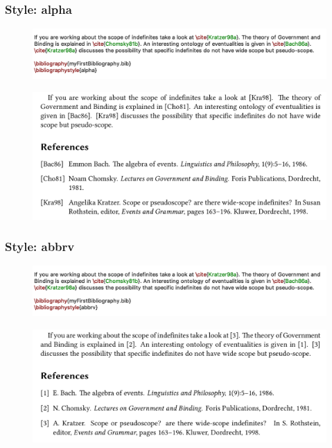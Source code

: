 \begin{frame}[fragile]
\frametitle{Style: alpha}

\begin{figure}
\centering
\includegraphics[width=.75\textwidth]{../../texfiles-beamer/tex-material/WissArb-latex/xelatex-bib-alpha}
\end{figure}

\begin{figure}
\centering
\includegraphics[width=.75\textwidth]{../../texfiles-beamer/tex-material/WissArb-latex/xelatex-bib-alpha-pdf}
\end{figure}

\end{frame}


\begin{frame}[fragile]
\frametitle{Style: abbrv}

\begin{figure}
\centering
\includegraphics[width=.75\textwidth]{../../texfiles-beamer/tex-material/WissArb-latex/xelatex-bib-abbrv}
\end{figure}

\begin{figure}
\centering
\includegraphics[width=.75\textwidth]{../../texfiles-beamer/tex-material/WissArb-latex/xelatex-bib-abbrv-pdf}
\end{figure}

\end{frame}



